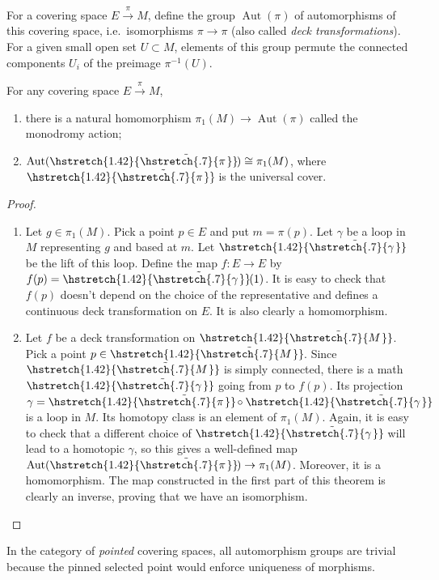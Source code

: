 \documentclass[english,letterpaper]{article}%
\numberwithin{equation}{section}
\numberwithin{figure}{section}
\numberwithin{table}{section}
\theoremstyle{definition}
\theoremstyle{definition}
\theoremstyle{definition}
\theoremstyle{plain}
\theoremstyle{plain}
\theoremstyle{plain}
\theoremstyle{plain}
\theoremstyle{remark}
\theoremstyle{remark}
\DeclareMathOperator{\Aut}{Aut}
\newcommand\wt[1]{\hstretch{1.42}{\tilde{\hstretch{.7}{#1\mkern2mu}}}\mkern-2mu}
\begin{document}
\begin{defn}
For a covering space $E\overset{\pi}{\to}{M}$, define the group $\Aut(\pi)$ of automorphisms of this covering space, i.e.\ isomorphisms $\pi\to \pi$ (also called \emph{deck transformations}). For a given small open set $U\subset M$, elements of this group permute the connected components $U_i$ of the preimage $\pi^{-1}(U)$.
\end{defn}

\begin{thm}
For any covering space $E\overset{\pi}\to M$, 
\begin{enumerate}
    \item there is a natural homomorphism $\pi_1(M)\to \Aut(\pi)$ called the monodromy action;
    \item $\Aut(\wt \pi)\cong\pi_1(M)$, where $\wt\pi$ is the universal cover.
\end{enumerate}
\end{thm}
\begin{proof}
\begin{enumerate}
    \item Let $g\in\pi_1(M)$. Pick a point $p\in E$ and put $m=\pi(p)$. Let $\gamma$ be a loop in $M$ representing $g$ and based at $m$. Let $\wt\gamma$ be the lift of this loop. Define the map $f:E\to E$ by $f(p)=\wt\gamma(1)$. It is easy to check that $f(p)$ doesn't depend on the choice of the representative and defines a continuous deck transformation on $E$. It is also clearly a homomorphism.
    \item Let $f$ be a deck transformation on $\wt M$. Pick a point $p\in\wt M$. Since $\wt M$ is simply connected, there is a math $\wt\gamma$ going from $p$ to $f(p)$. Its projection $\gamma=\wt\pi\circ\wt\gamma$ is a loop in $M$. Its homotopy class is an element of $\pi_1(M)$. Again, it is easy to check that a different choice of $\wt\gamma$ will lead to a homotopic $\gamma$, so this gives a well-defined map $\Aut(\wt\pi)\to\pi_1(M)$. Moreover, it is a homomorphism. The map constructed in the first part of this theorem is clearly an inverse, proving that we have an isomorphism.
\end{enumerate}
\end{proof}


\begin{rem}
    In the category of \emph{pointed} covering spaces, all automorphism groups are trivial because the pinned selected point would enforce uniqueness of morphisms.
\end{rem}
\end{document}
